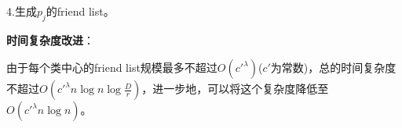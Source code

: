 \documentclass[lang=cn,newtx,10pt,scheme=chinese,chinesefont=nofont,citestyle=gb7714-2015, bibstyle=gb7714-2015]{elegantbook}
\begin{document}
\begin{refsection}
4.生成$p_j$的friend list。

\quad


\textbf{时间复杂度改进}：

由于每个类中心的friend list规模最多不超过$O(c'^\lambda)$($c'$为常数)，总的时间复杂度不超过$O(c'^\lambda n\log{n}\log{\frac{D}{r}})$，进一步地，可以将这个复杂度降低至$O(c'^\lambda n\log{n})$。



\printbibliography[heading=subbibliography, title={本章参考文献}]
\end{refsection}
\end{document}
